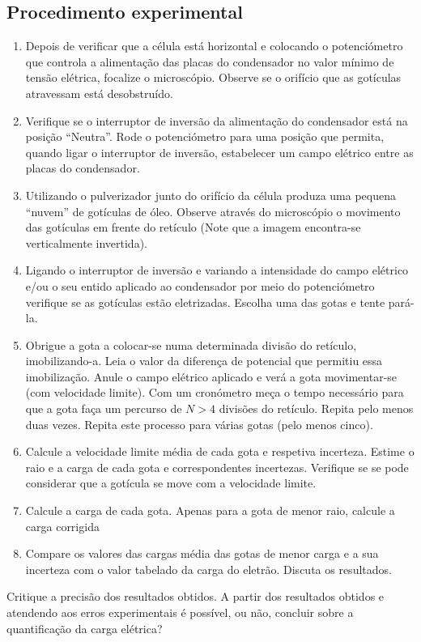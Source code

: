 \documentclass[a4paper,twoside,12pt]{article}      %
\begin{document}
\begin{multicols}{2}
\section{\sf Procedimento experimental}

\begin{enumerate}
\item   Depois de verificar que a célula está horizontal e colocando o potenciómetro que 
controla a alimentação das placas do condensador no valor mínimo de tensão elétrica,
focalize o microscópio. Observe se o orifício que as gotículas atravessam está 
desobstruído.
\item    Verifique se o interruptor de inversão da alimentação do condensador está na posição ``Neutra''.
Rode o potenciómetro para uma posição que permita, quando ligar o interruptor de inversão, estabelecer um campo elétrico entre as placas do condensador. 
\item     Utilizando o pulverizador junto do orifício da célula produza uma pequena ``nuvem'' %
de gotículas de óleo. Observe através do microscópio o movimento das gotículas em 
frente do retículo (Note que a imagem encontra-se verticalmente invertida).
\item     Ligando o interruptor de inversão e variando a intensidade do campo elétrico e/ou o seu entido aplicado ao condensador por meio do 
potenciómetro verifique se as gotículas estão eletrizadas. Escolha uma das gotas e tente pará-la.
 \item Obrigue a gota a colocar-se numa determinada divisão do retículo, imobilizando-a. 
Leia o valor da diferença de potencial que permitiu essa imobilização. Anule o 
campo elétrico aplicado e verá a gota movimentar-se (com velocidade limite). Com um 
cronómetro meça o tempo necessário para que a gota faça um percurso de $N>4$ divisões
do retículo. Repita pelo menos duas vezes. Repita este processo para várias gotas (pelo 
menos cinco). 
\item   Calcule a velocidade limite média de cada gota e respetiva incerteza. Estime o raio e 
a carga de cada gota e correspondentes incertezas. Verifique se se pode considerar 
que a gotícula se move com a velocidade limite.
\item Calcule a carga de cada gota. Apenas para a gota de menor raio, calcule a carga corrigida
\item   Compare os valores das cargas média das gotas de menor carga  e a sua incerteza com o valor  tabelado da carga do eletrão. Discuta os resultados.
\end{enumerate}

Critique a precisão dos resultados obtidos. A partir dos resultados obtidos e atendendo
aos erros experimentais é possível, ou não, concluir sobre a quantificação da carga elétrica?

\end{multicols}
\end{document}
